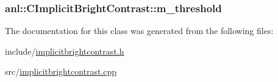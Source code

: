 \label{classanl_1_1CImplicitBrightContrast_a30f07efced6f3942452432f53b313e08}
\hypertarget{classanl_1_1CImplicitBrightContrast_ae3c48f4d38fad67e75d5867b245cbd39}{
\subsubsection[{m\_\-threshold}]{ {\bf anl::CImplicitBrightContrast::m\_\-threshold}}}
\label{classanl_1_1CImplicitBrightContrast_ae3c48f4d38fad67e75d5867b245cbd39}


The documentation for this class was generated from the following files:\begin{DoxyCompactItemize}
\item 
include/\hyperlink{implicitbrightcontrast_8h}{implicitbrightcontrast.h}\item 
src/\hyperlink{implicitbrightcontrast_8cpp}{implicitbrightcontrast.cpp}\end{DoxyCompactItemize}
